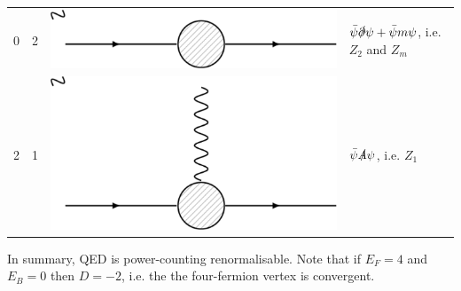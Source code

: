\documentclass[a4paper,12pt]{article}
\begin{document}
\begin{table}[h!]
\begin{tabular}{llll}
0     & 2     & \includegraphics[scale=0.2]{figs/pc4.pdf}  & $\bar{\psi}\slashed{\partial}\psi + \bar{\psi}m\psi$, i.e. $Z_2$ and $Z_m$                            \\
2     & 1     & \includegraphics[scale=0.2]{figs/pc5.pdf} & 
$\bar{\psi}\slashed{A}\psi$, i.e. $Z_1$
\end{tabular}
\end{table}
In summary, QED is power-counting renormalisable. Note that if $E_F=4$ and $E_B=0$ then $D=-2$, i.e. the the four-fermion vertex is convergent.
\end{document}
